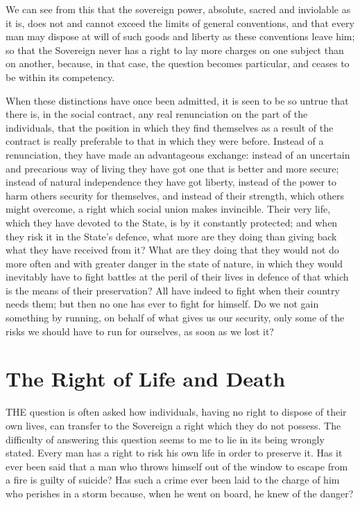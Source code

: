 \documentclass[12pt]{book}
\begin{document}
We can see from this that the sovereign power, absolute, sacred and inviolable as it is, does not and cannot exceed the limits of general conventions, and that every man may dispose at will of such goods and liberty as these conventions leave him; so that the Sovereign never has a right to lay more charges on one subject than on another, because, in that case, the question becomes particular, and ceases to be within its competency.

When these distinctions have once been admitted, it is seen to be so untrue that there is, in the social contract, any real renunciation on the part of the individuals, that the position in which they find themselves as a result of the contract is really preferable to that in which they were before. Instead of a renunciation, they have made an advantageous exchange: instead of an uncertain and precarious way of living they have got one that is better and more secure; instead of natural independence they have got liberty, instead of the power to harm others security for themselves, and instead of their strength, which others might overcome, a right which social union makes invincible. Their very life, which they have devoted to the State, is by it constantly protected; and when they risk it in the State's defence, what more are they doing than giving back what they have received from it? What are they doing that they would not do more often and with greater danger in the state of nature, in which they would inevitably have to fight battles at the peril of their lives in defence of that which is the means of their preservation? All have indeed to fight when their country needs them; but then no one has ever to fight for himself. Do we not gain something by running, on behalf of what gives us our security, only some of the risks we should have to run for ourselves, as soon as we lost it?

\section{The Right of Life and Death}
THE question is often asked how individuals, having no right to dispose of their own lives, can transfer to the Sovereign a right which they do not possess. The difficulty of answering this question seems to me to lie in its being wrongly stated. Every man has a right to risk his own life in order to preserve it. Has it ever been said that a man who throws himself out of the window to escape from a fire is guilty of suicide? Has such a crime ever been laid to the charge of him who perishes in a storm because, when he went on board, he knew of the danger?
\end{document}

